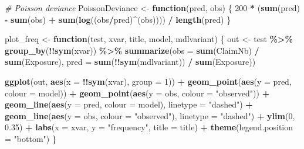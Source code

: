 \documentclass[
]{article}
\newenvironment{Shaded}{\begin{snugshade}}{\end{snugshade}}
\newcommand{\AttributeTok}[1]{\textcolor[rgb]{0.13,0.29,0.53}{#1}}
\newcommand{\CommentTok}[1]{\textcolor[rgb]{0.56,0.35,0.01}{\textit{#1}}}
\newcommand{\ControlFlowTok}[1]{\textcolor[rgb]{0.13,0.29,0.53}{\textbf{#1}}}
\newcommand{\DecValTok}[1]{\textcolor[rgb]{0.00,0.00,0.81}{#1}}
\newcommand{\FloatTok}[1]{\textcolor[rgb]{0.00,0.00,0.81}{#1}}
\newcommand{\FunctionTok}[1]{\textcolor[rgb]{0.13,0.29,0.53}{\textbf{#1}}}
\newcommand{\NormalTok}[1]{#1}
\newcommand{\OtherTok}[1]{\textcolor[rgb]{0.56,0.35,0.01}{#1}}
\newcommand{\SpecialCharTok}[1]{\textcolor[rgb]{0.81,0.36,0.00}{\textbf{#1}}}
\newcommand{\StringTok}[1]{\textcolor[rgb]{0.31,0.60,0.02}{#1}}
\begin{document}
\begin{Shaded}
\begin{Highlighting}[]
\CommentTok{\# Poisson deviance}
\NormalTok{PoissonDeviance }\OtherTok{\textless{}{-}} \ControlFlowTok{function}\NormalTok{(pred, obs) \{}
    \DecValTok{200} \SpecialCharTok{*}\NormalTok{ (}\FunctionTok{sum}\NormalTok{(pred) }\SpecialCharTok{{-}} \FunctionTok{sum}\NormalTok{(obs) }\SpecialCharTok{+} \FunctionTok{sum}\NormalTok{(}\FunctionTok{log}\NormalTok{((obs}\SpecialCharTok{/}\NormalTok{pred)}\SpecialCharTok{\^{}}\NormalTok{(obs)))) }\SpecialCharTok{/} \FunctionTok{length}\NormalTok{(pred)}
\NormalTok{\}}
\end{Highlighting}
\end{Shaded}

\begin{Shaded}
\begin{Highlighting}[]
\NormalTok{plot\_freq }\OtherTok{\textless{}{-}} \ControlFlowTok{function}\NormalTok{(test, xvar, title, model, mdlvariant) \{}
\NormalTok{  out }\OtherTok{\textless{}{-}}\NormalTok{ test }\SpecialCharTok{\%\textgreater{}\%} \FunctionTok{group\_by}\NormalTok{(}\SpecialCharTok{!!}\FunctionTok{sym}\NormalTok{(xvar)) }\SpecialCharTok{\%\textgreater{}\%}
            \FunctionTok{summarize}\NormalTok{(}\AttributeTok{obs =} \FunctionTok{sum}\NormalTok{(ClaimNb) }\SpecialCharTok{/} \FunctionTok{sum}\NormalTok{(Exposure), }\AttributeTok{pred =} \FunctionTok{sum}\NormalTok{(}\SpecialCharTok{!!}\FunctionTok{sym}\NormalTok{(mdlvariant)) }\SpecialCharTok{/} \FunctionTok{sum}\NormalTok{(Exposure))}
  
  \FunctionTok{ggplot}\NormalTok{(out, }\FunctionTok{aes}\NormalTok{(}\AttributeTok{x =} \SpecialCharTok{!!}\FunctionTok{sym}\NormalTok{(xvar), }\AttributeTok{group =} \DecValTok{1}\NormalTok{)) }\SpecialCharTok{+}
    \FunctionTok{geom\_point}\NormalTok{(}\FunctionTok{aes}\NormalTok{(}\AttributeTok{y =}\NormalTok{ pred, }\AttributeTok{colour =}\NormalTok{ model)) }\SpecialCharTok{+}
    \FunctionTok{geom\_point}\NormalTok{(}\FunctionTok{aes}\NormalTok{(}\AttributeTok{y =}\NormalTok{ obs, }\AttributeTok{colour =} \StringTok{"observed"}\NormalTok{)) }\SpecialCharTok{+} 
    \FunctionTok{geom\_line}\NormalTok{(}\FunctionTok{aes}\NormalTok{(}\AttributeTok{y =}\NormalTok{ pred, }\AttributeTok{colour =}\NormalTok{ model), }\AttributeTok{linetype =} \StringTok{"dashed"}\NormalTok{) }\SpecialCharTok{+}
    \FunctionTok{geom\_line}\NormalTok{(}\FunctionTok{aes}\NormalTok{(}\AttributeTok{y =}\NormalTok{ obs, }\AttributeTok{colour =} \StringTok{"observed"}\NormalTok{), }\AttributeTok{linetype =} \StringTok{"dashed"}\NormalTok{) }\SpecialCharTok{+}
    \FunctionTok{ylim}\NormalTok{(}\DecValTok{0}\NormalTok{, }\FloatTok{0.35}\NormalTok{) }\SpecialCharTok{+} \FunctionTok{labs}\NormalTok{(}\AttributeTok{x =}\NormalTok{ xvar, }\AttributeTok{y =} \StringTok{"frequency"}\NormalTok{, }\AttributeTok{title =}\NormalTok{ title) }\SpecialCharTok{+}
    \FunctionTok{theme}\NormalTok{(}\AttributeTok{legend.position =} \StringTok{"bottom"}\NormalTok{)}
\NormalTok{\}}
\end{Highlighting}
\end{Shaded}
\end{document}
